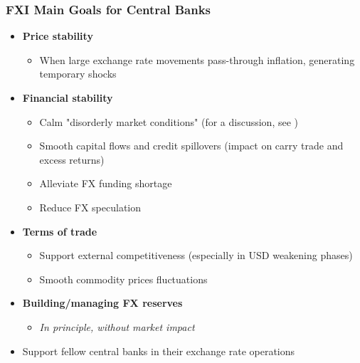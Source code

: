 \documentclass{beamer}
\begin{document}
\begin{frame}
  \frametitle{FXI Main Goals for Central Banks}

  \begin{itemize}
  \item \textbf{Price stability}
    \begin{itemize}
    \item When large exchange rate movements pass-through inflation, generating temporary shocks
    \end{itemize}
    \item \textbf{Financial stability}
      \begin{itemize}
      \item Calm "disorderly market conditions" (for a discussion, see \href{https://www.imf.org/-/media/Files/Publications/covid19-special-notes/en-special-series-on-covid-19-central-bank-support-for-foreign-exchange-markets.ashx}{})
      \item Smooth capital flows and credit spillovers (impact on carry trade and excess returns)
      \item Alleviate FX funding shortage
      \item Reduce FX speculation
      \end{itemize}
    \item \textbf{Terms of trade}
      \begin{itemize}
      \item Support external competitiveness (especially in USD weakening phases)
      \item Smooth commodity prices fluctuations
      \end{itemize}
    \item \textbf{Building/managing FX reserves}
      \begin{itemize}
        \item \emph{In principle, without market impact}
        \end{itemize}
    \item Support fellow central banks in their exchange rate operations
  \end{itemize}
\end{frame}
\end{document}

